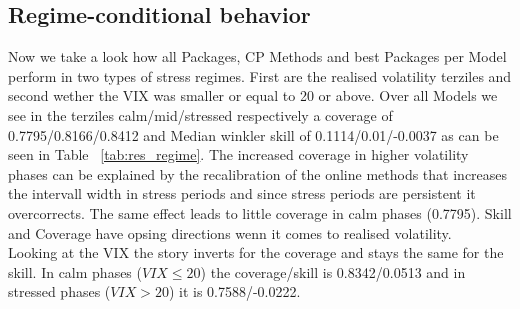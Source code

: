 \subsection{Regime-conditional behavior}
\label{sec:res:regime}
Now we take a look how all Packages, CP Methods and best Packages per Model perform in two types of stress regimes. First are the realised volatility terziles and second wether the VIX was smaller or equal to 20 or above. Over all Models we see in the terziles calm/mid/stressed respectively a coverage of 0.7795/0.8166/0.8412 and Median winkler skill of 0.1114/0.01/-0.0037 as can be seen in Table ~\ref{tab:res_regime}. The increased coverage in higher volatility phases can be explained by the recalibration of the online methods that increases the intervall width in stress periods and since stress periods are persistent it overcorrects. The same effect leads to little coverage in calm phases (0.7795). Skill and Coverage have opsing directions wenn it comes to realised volatility. \\
Looking at the VIX the story inverts for the coverage and stays the same for the skill. In calm phases ($VIX\leq20$) the coverage/skill is 0.8342/0.0513 and in stressed phases ($VIX>20$) it is 0.7588/-0.0222. \\

